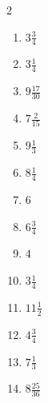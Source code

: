 \documentclass[12pt]{article}
\begin{document}
\begin{multicols}{2}
\begin{enumerate}
\item $ 3 \frac{3}{4} $
\item $ 3 \frac{1}{4} $
\item $ 9 \frac{17}{30} $
\item $ 7 \frac{2}{15} $
\item $ 9 \frac{1}{3} $
\item $ 8 \frac{1}{4} $
\item $ 6 $
\item $ 6 \frac{3}{4} $
\item $ 4 $
\item $ 3 \frac{1}{4} $
\item $ 11 \frac{1}{2} $
\item $ 4 \frac{3}{4} $
\item $ 7 \frac{1}{3} $
\item $ 8 \frac{25}{36} $
\end{enumerate}\end{multicols}\newpage
\end{document}
